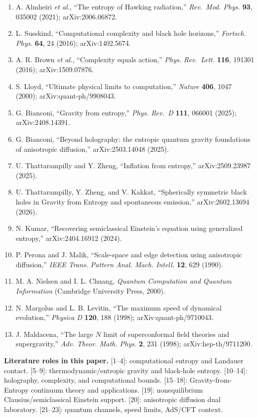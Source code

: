 \documentclass[
  11pt,
]{article}
\newcounter{none} %
\begin{document}
\begin{enumerate}
\item
  A. Almheiri \emph{et al.}, ``The entropy of Hawking radiation,''
  \emph{Rev.~Mod. Phys.} \textbf{93}, 035002 (2021); arXiv:2006.06872.
\item
  L. Susskind, ``Computational complexity and black hole horizons,''
  \emph{Fortsch. Phys.} \textbf{64}, 24 (2016); arXiv:1402.5674.
\item
  A. R. Brown \emph{et al.}, ``Complexity equals action,'' \emph{Phys.
  Rev.~Lett.} \textbf{116}, 191301 (2016); arXiv:1509.07876.
\item
  S. Lloyd, ``Ultimate physical limits to computation,'' \emph{Nature}
  \textbf{406}, 1047 (2000); arXiv:quant-ph/9908043.
\item
  G. Bianconi, ``Gravity from entropy,'' \emph{Phys. Rev.~D}
  \textbf{111}, 066001 (2025); arXiv:2408.14391.
\item
  G. Bianconi, ``Beyond holography: the entropic quantum gravity
  foundations of anisotropic diffusion,'' arXiv:2503.14048 (2025).
\item
  U. Thattarampilly and Y. Zheng, ``Inflation from entropy,''
  arXiv:2509.23987 (2025).
\item
  U. Thattarampilly, Y. Zheng, and V. Kakkat, ``Spherically symmetric
  black holes in Gravity from Entropy and spontaneous emission,''
  arXiv:2602.13694 (2026).
\item
  N. Kumar, ``Recovering semiclassical Einstein's equation using
  generalized entropy,'' arXiv:2404.16912 (2024).
\item
  P. Perona and J. Malik, ``Scale-space and edge detection using
  anisotropic diffusion,'' \emph{IEEE Trans. Pattern Anal. Mach.
  Intell.} \textbf{12}, 629 (1990).
\item
  M. A. Nielsen and I. L. Chuang, \emph{Quantum Computation and Quantum
  Information} (Cambridge University Press, 2000).
\item
  N. Margolus and L. B. Levitin, ``The maximum speed of dynamical
  evolution,'' \emph{Physica D} \textbf{120}, 188 (1998);
  arXiv:quant-ph/9710043.
\item
  J. Maldacena, ``The large \(N\) limit of superconformal field theories
  and supergravity,'' \emph{Adv. Theor. Math. Phys.} \textbf{2}, 231
  (1998); arXiv:hep-th/9711200.
\end{enumerate}

\textbf{Literature roles in this paper.} [1--4]: computational
entropy and Landauer contact. [5--9]: thermodynamic/entropic gravity
and black-hole entropy. [10--14]: holography, complexity, and
computational bounds. [15--18]: Gravity-from-Entropy continuum
theory and applications. [19]: nonequilibrium Clausius/semiclassical
Einstein support. [20]: anisotropic diffusion dual laboratory.
[21--23]: quantum channels, speed limits, AdS/CFT context.
\end{document}
